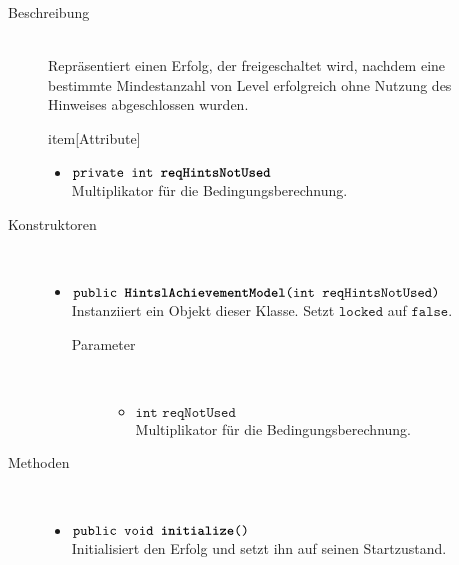 \begin{description}
\item[Beschreibung] \hfill \\ Repräsentiert einen Erfolg, der freigeschaltet wird, nachdem eine bestimmte Mindestanzahl von Level erfolgreich ohne Nutzung des Hinweises abgeschlossen wurden.
	
item[Attribute] \hfill \\
	\vspace{-.8cm}
	\begin{itemize}
		\item $\texttt{private int \textbf{reqHintsNotUsed}}$ \\ Multiplikator für die Bedingungsberechnung.
	\end{itemize}	
	
\item[Konstruktoren] \hfill \\
	\vspace{-.8cm}
	\begin{itemize}
		\item $\texttt{public \textbf{HintslAchievementModel}(int reqHintsNotUsed)}$ \\ Instanziiert ein Objekt dieser Klasse. Setzt $\texttt{locked}$ auf $\texttt{false}$.
		\begin{description}
			\item[Parameter] \hfill \\
			\vspace{-.8cm}
			\begin{itemize}
				\item $\texttt{int reqNotUsed}$ \\ Multiplikator für die Bedingungsberechnung.
			\end{itemize}
		\end{description}
	\end{itemize}
	
\item[Methoden] \hfill \\
	\vspace{-.8cm}
	\begin{itemize}
		\item $\texttt{public void \textbf{initialize}()}$ \\ Initialisiert den Erfolg und setzt ihn auf seinen Startzustand.
		

\end{itemize}
\end{description}
